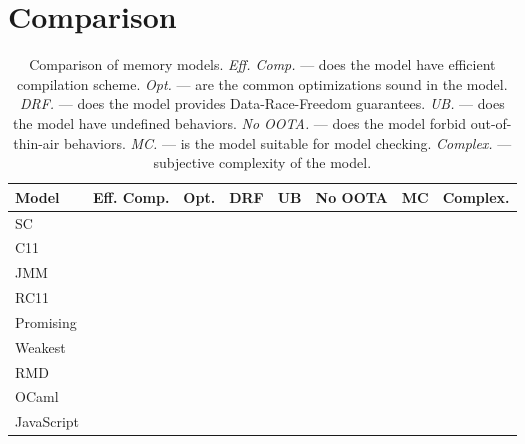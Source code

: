 \section{Comparison}

\begin{table*}[t]
\centering
\begin{tabular}{ |l|c|c|c|c|c|c|c| }
                                                                            \hline

 Model          & Eff. Comp. & Opt. & DRF & UB & No OOTA & MC & Complex. \\ \hline

 SC             &            &      &     &    &         &    &          \\ \hline

 C11            &            &      &     &    &         &    &          \\ \hline

 JMM            &            &      &     &    &         &    &          \\ \hline

 RC11           &            &      &     &    &         &    &          \\ \hline

 Promising      &            &      &     &    &         &    &          \\ \hline

 Weakest        &            &      &     &    &         &    &          \\ \hline

 RMD            &            &      &     &    &         &    &          \\ \hline

 OCaml          &            &      &     &    &         &    &          \\ \hline

 JavaScript     &            &      &     &    &         &    &          \\ \hline

\end{tabular}
\caption{Comparison of memory models. 
  \textit{Eff. Comp.} --- does the model have efficient compilation scheme.
  \textit{Opt.} --- are the common optimizations sound in the model.
  \textit{DRF.} --- does the model provides Data-Race-Freedom guarantees.
  \textit{UB.} --- does the model have undefined behaviors.
  \textit{No OOTA.} --- does the model forbid out-of-thin-air behaviors.
  \textit{MC.} --- is the model suitable for model checking.
  \textit{Complex.} --- subjective complexity of the model.
}
\label{table:summary}
\end{table*}